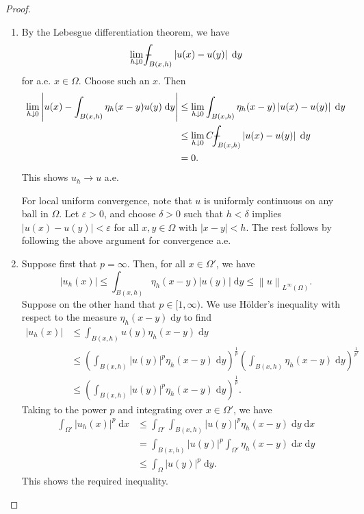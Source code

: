 \documentclass{book}
\renewcommand{\d}{\mathrm{d}}
\renewcommand{\epsilon}{\varepsilon}
\newcommand{\abs}[1]{\left\lvert {#1} \right\rvert}
\newcommand{\norm}[1]{\left\lVert {#1} \right\rVert}
\newcommand{\parens}[1]{\left( {#1} \right)}
\def\Xint#1{\mathchoice
{\XXint\displaystyle\textstyle{#1}}%
{\XXint\textstyle\scriptstyle{#1}}%
{\XXint\scriptstyle\scriptscriptstyle{#1}}%
{\XXint\scriptscriptstyle\scriptscriptstyle{#1}}%
\!\int}
\def\XXint#1#2#3{{\setbox0=\hbox{$#1{#2#3}{\int}$ }
\vcenter{\hbox{$#2#3$ }}\kern-.6\wd0}}
\def\dashint{\Xint-}
\theoremstyle{definition}
\numberwithin{equation}{chapter}
\begin{document}
\begin{proof} \begin{enumerate}[label=(\alph*)]
    \item By the Lebesgue differentiation theorem, we have 
    \begin{equation}
        \lim_{h \downarrow 0} \dashint_{B(x,h)} \abs{u(x) - u(y)} \; \d{y}
    \end{equation}
    for a.e. $x \in \Omega$. Choose such an $x$. Then 
    \begin{equation} \begin{aligned}
        \lim_{h \downarrow 0} \abs{ u(x) - \int_{B(x,h)} \eta_h(x-y) u(y) \; \d{y} } 
        &\leq \lim_{h \downarrow 0} \int_{B(x,h)} \eta_h(x-y) \abs{ u(x) - u(y) } \; \d{y} \\
        &\leq \lim_{h \downarrow 0} C \dashint_{B(x,h)} \abs{u(x) - u(y)} \; \d{y} \\
        &= 0.
    \end{aligned} \end{equation}
    This shows $u_h \to u$ a.e. 

    For local uniform convergence, note that $u$ is uniformly continuous on any ball in $\Omega$. Let $\epsilon > 0$, and choose $\delta > 0$ such that $h < \delta$ implies $\abs{u(x) - u(y)} < \epsilon$ for all $x,y \in \Omega$ with $\abs{x-y} < h$. The rest follows by following the above argument for convergence a.e.

    \item Suppose first that $p = \infty$. Then, for all $x \in \Omega'$, we have 
    \begin{equation}
        \abs{u_h(x)}
        \leq \int_{B(x,h)} \eta_h(x-y) \abs{u(y)} \; \d{y}
        \leq \norm{u}_{L^\infty(\Omega)}.
    \end{equation}
    Suppose on the other hand that $p \in [1,\infty)$. We use H\"older's inequality with respect to the measure $\eta_h(x-y) \; \d{y}$ to find 
    \begin{equation} \begin{aligned}
        \abs{u_h(x)} 
        &\leq \int_{B(x,h)} u(y) \eta_h(x-y) \; \d{y} \\
        &\leq \parens{ \int_{B(x,h)} \abs{u(y)}^p \eta_h(x-y) \; \d{y} }^\frac1p \parens{ \int_{B(x,h)} \eta_h(x-y) \; \d{y} }^\frac1{p'} \\
        &\leq \parens{ \int_{B(x,h)} \abs{u(y)}^p \eta_h(x-y) \; \d{y} }^\frac1p.
    \end{aligned} \end{equation}
    Taking to the power $p$ and integrating over $x \in \Omega'$, we have 
    \begin{equation} \begin{aligned}
        \int_{\Omega'} \abs{u_h(x)}^p \; \d{x}
        &\leq \int_{\Omega'} \int_{B(x,h)} \abs{u(y)}^p \eta_h(x-y) \; \d{y} \; \d{x} \\
        &= \int_{B(x,h)} \abs{u(y)}^p \int_{\Omega'} \eta_h(x-y) \; \d{x} \; \d{y} \\
        &\leq \int_{\Omega} \abs{u(y)}^p \; \d{y}.
    \end{aligned} \end{equation}
    This shows the required inequality.


\end{enumerate}
\end{proof}
\end{document}
